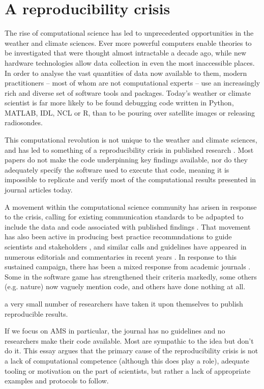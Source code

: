 \section{A reproducibility crisis}
The rise of computational science has led to unprecedented opportunities in the weather and climate sciences. Ever more powerful computers enable theories to be investigated that were thought almost intractable a decade ago, while new hardware technologies allow data collection in even the most inaccessible places. In order to analyse the vast quantities of data now available to them, modern practitioners – most of whom are not computational experts – use an increasingly rich and diverse set of software tools and packages. Today's weather or climate scientist is far more likely to be found debugging code written in Python, MATLAB, IDL, NCL or R, than to be pouring over satellite images or releasing radiosondes. 

This computational revolution is not unique to the weather and climate sciences, and has led to something of a reproducibility crisis in published research \citep[e.g.][]{Peng2011}. Most papers do not make the code underpinning key findings available, nor do they adequately specify the software used to execute that code, meaning it is impossible to replicate and verify most of the computational results presented in journal articles today.

A movement within the computational science community has arisen in response to the crisis, calling for existing communication standards to be adpapted to include the data and code associated with published findings \citep[e.g.][]{Stodden2014}. That movement has also been active in producing best practice recommndations to guide scientists and stakeholders \citep{Stodden2014}, and similar calls and guidelines have appeared in numerous editorials and commentaries in recent years \citet{Barnes2010,Merali2010,Ince2012}. In response to this sustained campaign, there has been a mixed response from academic journals \citep{Stodden2013}. Some in the software game has strengthened their criteria markedly, some others (e.g. nature) now vaguely mention code, and others have done nothing at all. 

a very small number of researchers have taken it upon themselves to publish reproducible results. 

If we focus on AMS in particular, the journal has no guidelines and no researchers make their code available. Most are sympathic to the idea but don't do it. This essay argues that the primary cause of the reproducibility crisis is not a lack of computational competence (although this does play a role), adequate tooling or motivation on the part of scientists, but rather a lack of appropriate examples and protocols to follow.

